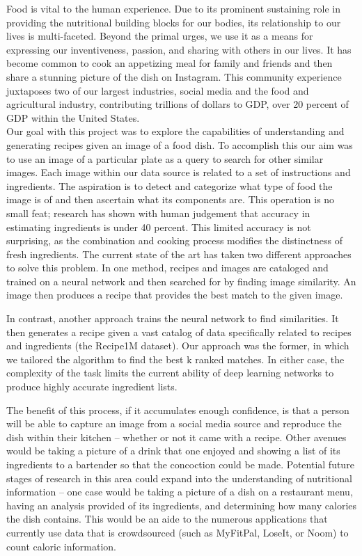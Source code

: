 \documentclass[10pt,twocolumn,letterpaper]{article}
\begin{document}
Food is vital to the human experience. Due to its prominent sustaining role in providing the nutritional building blocks for our bodies, its relationship to our lives is multi-faceted. Beyond the primal urges, we use it as a means for expressing our inventiveness, passion, and sharing with others in our lives. It has become common to cook an appetizing meal for family and friends and then share a stunning picture of the dish on Instagram. This community experience juxtaposes two of our largest industries, social media and the food and agricultural industry, contributing trillions of dollars to GDP, over 20 percent of GDP within the United States. \\
Our goal with this project was to explore the capabilities of understanding and generating recipes given an image of a food dish. To accomplish this our aim was to use an image of a particular plate as a query to search for other similar images. Each image within our data source is related to a set of instructions and ingredients. The aspiration is to detect and categorize what type of food the image is of and then ascertain what its components are. This operation is no small feat; research has shown with human judgement that accuracy in estimating ingredients is under 40 percent. This limited accuracy is not surprising, as the combination and cooking process modifies the distinctness of fresh ingredients. The current state of the art has taken two different approaches to solve this problem. In one method, recipes and images are cataloged and trained on a neural network and then searched for by finding image similarity. An image then produces a recipe that provides the best match to the given image.

In contrast, another approach trains the neural network to find similarities. It then generates a recipe given a vast catalog of data specifically related to recipes and ingredients (the Recipe1M dataset). Our approach was the former, in which we tailored the algorithm to find the best k ranked matches. In either case, the complexity of the task limits the current ability of deep learning networks to produce highly accurate ingredient lists. 

The benefit of this process, if it accumulates enough confidence, is that a person will be able to capture an image from a social media source and reproduce the dish within their kitchen – whether or not it came with a recipe. Other avenues would be taking a picture of a drink that one enjoyed and showing a list of its ingredients to a bartender so that the concoction could be made. Potential future stages of research in this area could expand into the understanding of nutritional information – one case would be taking a picture of a dish on a restaurant menu, having an analysis provided of its ingredients, and determining how many calories the dish contains. This would be an aide to the numerous applications that currently use data that is crowdsourced (such as MyFitPal, LoseIt, or Noom) to count caloric information.
\end{document}
